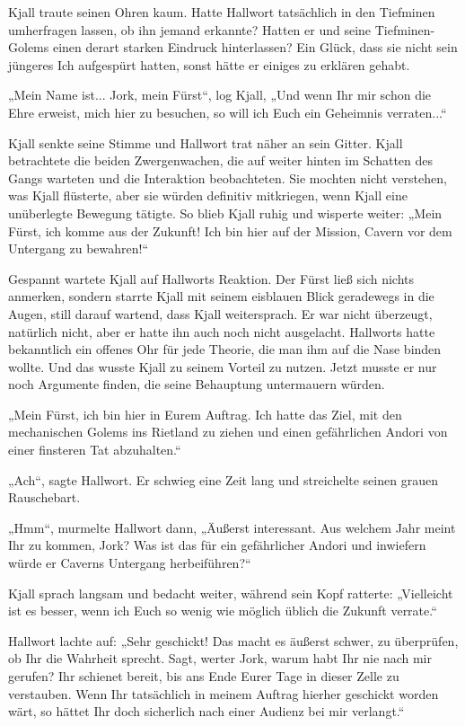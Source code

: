 \documentclass[10pt, a4paper, oneside]{book}
\begin{document}
Kjall traute seinen Ohren kaum. Hatte Hallwort tatsächlich in den Tiefminen umherfragen lassen, ob ihn jemand erkannte? Hatten er und seine Tiefminen-Golems einen derart starken Eindruck hinterlassen? Ein Glück, dass sie nicht sein jüngeres Ich aufgespürt hatten, sonst hätte er einiges zu erklären gehabt.

„Mein Name ist... Jork, mein Fürst“, log Kjall, „Und wenn Ihr mir schon die Ehre erweist, mich hier zu besuchen, so will ich Euch ein Geheimnis verraten...“

Kjall senkte seine Stimme und Hallwort trat näher an sein Gitter. Kjall betrachtete die beiden Zwergenwachen, die auf weiter hinten im Schatten des Gangs warteten und die Interaktion beobachteten. Sie mochten nicht verstehen, was Kjall flüsterte, aber sie würden definitiv mitkriegen, wenn Kjall eine unüberlegte Bewegung tätigte. So blieb Kjall ruhig und wisperte weiter: „Mein Fürst, ich komme aus der Zukunft! Ich bin hier auf der Mission, Cavern vor dem Untergang zu bewahren!“

Gespannt wartete Kjall auf Hallworts Reaktion. Der Fürst ließ sich nichts anmerken, sondern starrte Kjall mit seinem eisblauen Blick geradewegs in die Augen, still darauf wartend, dass Kjall weitersprach. Er war nicht überzeugt, natürlich nicht, aber er hatte ihn auch noch nicht ausgelacht. Hallworts hatte bekanntlich ein offenes Ohr für jede Theorie, die man ihm auf die Nase binden wollte. Und das wusste Kjall zu seinem Vorteil zu nutzen. Jetzt musste er nur noch Argumente finden, die seine Behauptung untermauern würden.

„Mein Fürst, ich bin hier in Eurem Auftrag. Ich hatte das Ziel, mit den mechanischen Golems ins Rietland zu ziehen und einen gefährlichen Andori von einer finsteren Tat abzuhalten.“

„Ach“, sagte Hallwort. Er schwieg eine Zeit lang und streichelte seinen grauen Rauschebart.

„Hmm“, murmelte Hallwort dann, „Äußerst interessant. Aus welchem Jahr meint Ihr zu kommen, Jork? Was ist das für ein gefährlicher Andori und inwiefern würde er Caverns Untergang herbeiführen?“

Kjall sprach langsam und bedacht weiter, während sein Kopf ratterte: „Vielleicht ist es besser, wenn ich Euch so wenig wie möglich üblich die Zukunft verrate.“

Hallwort lachte auf: „Sehr geschickt! Das macht es äußerst schwer, zu überprüfen, ob Ihr die Wahrheit sprecht. Sagt, werter Jork, warum habt Ihr nie nach mir gerufen? Ihr schienet bereit, bis ans Ende Eurer Tage in dieser Zelle zu verstauben. Wenn Ihr tatsächlich in meinem Auftrag hierher geschickt worden wärt, so hättet Ihr doch sicherlich nach einer Audienz bei mir verlangt.“
\end{document}
